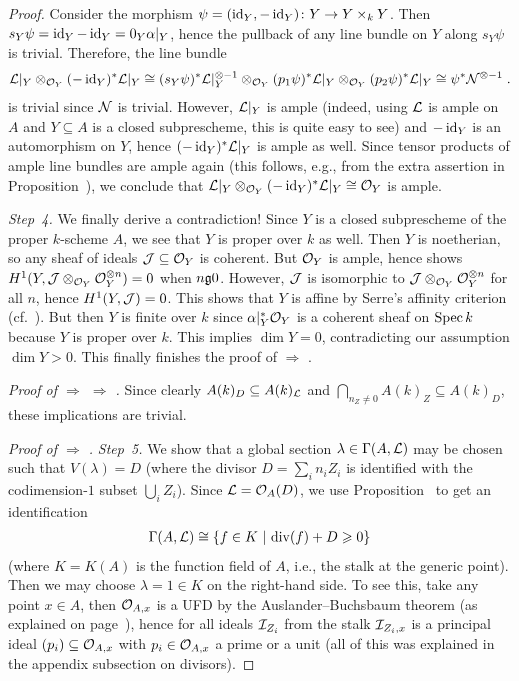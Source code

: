 \documentclass[a4paper,parskip=half,numbers=enddot, DIV=12]{scrreprt}
\renewcommand{\geq}{\geqslant}
\begin{document}
\begin{proof}
	Consider the morphism $\psi=(\id_Y,-\id_Y)\colon Y\morphism Y\times_kY$. Then $s_Y\psi=\operatorname{id}_Y-\operatorname{id}_Y=0_Y\alpha|_Y$, hence the pullback of any line bundle on $Y$ along $s_Y\psi$ is trivial. Therefore, the line bundle
	\begin{align*}
		\mathcal{L}|_Y\otimes_{\mathcal{O}_Y}(-\operatorname{id}_Y)^*\mathcal{L}|_Y\cong (s_Y\psi)^*\mathcal{L}|_Y^{\otimes -1}\otimes_{\mathcal{O}_Y} (p_1\psi)^*\mathcal{L}|_Y\otimes_{\mathcal{O}_Y} (p_2\psi)^*\mathcal{L}|_Y\cong\psi^*\mathcal{N}^{\otimes -1} \;.
	\end{align*}
	is trivial since $\mathcal{N}$ is trivial. However, $\mathcal{L}|_Y$ is ample (indeed, using $\mathcal{L}$ is ample on $A$ and $Y\subseteq A$ is a closed subprescheme, this is quite easy to see) and $-\operatorname{id}_Y$ is an automorphism on $Y$, hence $(-\operatorname{id}_Y)^*\mathcal{L}|_Y$ is ample as well. Since tensor products of ample line bundles are ample again (this follows, e.g., from the extra assertion in Proposition~), we conclude that $\mathcal{L}|_Y\otimes_{\mathcal{O}_Y}(-\operatorname{id}_Y)^*\mathcal{L}|_Y\cong \mathcal{O}_Y$ is ample.
	
	\emph{Step~4.} We finally derive a contradiction! Since $Y$ is a closed subprescheme of the proper $k$-scheme $A$, we see that $Y$ is proper over $k$ as well. Then $Y$ is noetherian, so any sheaf of ideals $\mathcal{J}\subseteq \mathcal{O}_Y$ is coherent. But $\mathcal{O}_Y$ is ample, hence \cite[Theorem~6]{alggeo2} shows $H^1(Y,\mathcal{J}\otimes_{\mathcal{O}_Y}\mathcal{O}_Y^{\otimes n})=0$ when $n\gge 0$. However, $\mathcal{J}$ is isomorphic to $\mathcal{J}\otimes_{\mathcal{O}_Y}\mathcal{O}_Y^{\otimes n}$ for all $n$, hence $H^1(Y,\mathcal{J})=0$. This shows that $Y$ is affine by Serre's affinity criterion (cf.\ \cite[Proposition~1.3.1]{alggeo2}). But then $Y$ is finite over $k$ since $\alpha|_Y^*\mathcal{O}_Y$ is a coherent sheaf on $\operatorname{Spec} k$ because $Y$ is proper over $k$. This implies $\dim Y=0$, contradicting our assumption $\dim Y>0$. This finally finishes the proof of  $\Rightarrow$ .
	
	\emph{Proof of  $\Rightarrow$  $\Rightarrow$ .} Since clearly $A(k)_D\subseteq A(k)_{\mathcal{L}}$ and $\bigcap_{n_Z\neq 0}A(k)_Z\subseteq A(k)_D$, these implications are trivial.
	
	\emph{Proof of  $\Rightarrow$ .} \emph{Step~5.} We show that a global section $\lambda\in\Gamma(A,\mathcal{L})$ may be chosen such that $V(\lambda)=D$ (where the divisor $D=\sum_in_iZ_i$ is identified with the codimension-$1$ subset $\bigcup_iZ_i$). Since $\mathcal{L}=\mathcal{O}_A(D)$, we use Proposition~ to get an identification
	\begin{align*}
		\Gamma(A,\Ll)\cong\left\{f\in K\st\div(f)+D\geq 0\right\}
	\end{align*}
	(where $K=K(A)$ is the function field of $A$, i.e., the stalk at the generic point). Then we may choose $\lambda=1\in K$ on the right-hand side. To see this, take any point $x\in A$, then $\mathcal{O}_{A,x}$ is a UFD by the Auslander--Buchsbaum theorem (as explained on page~\pageref{par:AuslanderBuchsbaum}), hence for all ideals $\mathcal{I}_{Z_i}$ from  the stalk $\mathcal{I}_{Z_i,x}$ is a principal ideal $(p_i)\subseteq \mathcal{O}_{A,x}$ with $p_i\in\mathcal{O}_{A,x}$ a prime or a unit (all of this was explained in the appendix subsection on divisors).
	

\end{proof}
\end{document}
